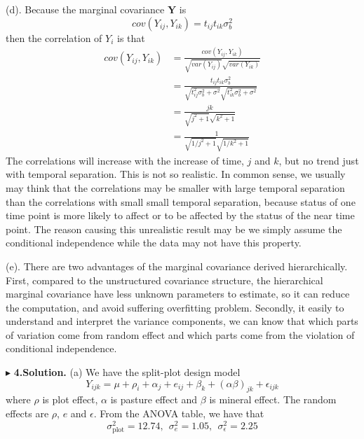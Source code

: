\documentclass[letterpaper, 12pt]{article}
\newcommand{\ba}{$$\begin{aligned}}
\newcommand{\ea}{\end{aligned}$$}
\begin{document}
(d). Because the marginal covariance $\bm{Y}$ is
$$
cov(Y_{ij},Y_{ik})=t_{ij}t_{ik}\sigma_b^2
$$
then the correlation of $Y_i$ is that 
\ba
cov(Y_{ij},Y_{ik})&=\frac{cov(Y_{ij},Y_{ik})}{\sqrt{var(Y_{ij})}\sqrt{var(Y_{ik})}}\\
&=\frac{t_{ij}t_{ik}\sigma_b^2}{\sqrt{t_{ij}^2\sigma_b^2+\sigma^2}\sqrt{t_{ik}^2\sigma_b^2+\sigma^2}}\\
&=\frac{jk}{\sqrt{j^2+1}\sqrt{k^2+1}}\\
&=\frac{1}{\sqrt{1/j^2+1}\sqrt{1/k^2+1}}
\ea
The correlations will increase with the increase of time, $j$ and $k$, but no trend just with temporal separation. This is not so realistic. In common sense, we usually may think that the correlations may be smaller with large temporal separation than the correlations with small small temporal separation, because status of one time point is more likely to affect or to be affected by the status of the near time point. The reason causing this unrealistic result may be we simply assume the conditional independence while the data may not have this property.

(e). There are two advantages of the marginal covariance derived hierarchically. First, compared to the unstructured covariance structure, the hierarchical marginal covariance have less unknown parameters to estimate, so it can reduce the computation, and avoid suffering overfitting problem. Secondly, it easily to understand and interpret the variance components, we can know that which parts of variation come from random effect and which parts come from the violation of conditional independence.




$\blacktriangleright$ \textbf{4.\quad Solution.} 
(a) We have the split-plot design model
$$
Y_{ijk}=\mu+\rho_i+\alpha_j+e_{ij}+\beta_k+(\alpha\beta)_{jk}+\epsilon_{ijk}
$$
where $\rho$ is plot effect, $\alpha$ is pasture effect and $\beta$ is mineral effect. The random effects are $\rho$, $e$ and $\epsilon$. From the ANOVA table, we have that
$$
\sigma_{\text{plot}}^2=12.74,\ \ \sigma^2_{e}=1.05,\ \ \sigma_\epsilon^2=2.25
$$












\end{document}
